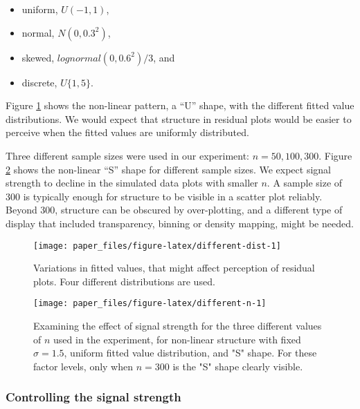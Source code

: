 \documentclass[]{interact}
\theoremstyle{plain}%
\theoremstyle{definition}
\theoremstyle{remark}
\providecommand{\tightlist}{%
  \setlength{\itemsep}{0pt}\setlength{\parskip}{0pt}}
\def\tightlist{}
\begin{document}
\begin{itemize}
\tightlist
\item
  uniform, \(U(-1, 1)\),
\item
  normal, \(N(0, 0.3^2)\),
\item
  skewed, \(lognormal(0, 0.6^2)/3\), and
\item
  discrete, \(U\{1, 5\}\).
\end{itemize}

\noindent Figure \ref{fig:different-dist} shows the non-linear pattern,
a ``U'' shape, with the different fitted value distributions. We would
expect that structure in residual plots would be easier to perceive when
the fitted values are uniformly distributed.

Three different sample sizes were used in our experiment:
\(n = 50, 100, 300\). Figure \ref{fig:different-n} shows the non-linear
``S'' shape for different sample sizes. We expect signal strength to
decline in the simulated data plots with smaller \(n\). A sample size of
300 is typically enough for structure to be visible in a scatter plot
reliably. Beyond 300, structure can be obscured by over-plotting, and a
different type of display that included transparency, binning or density
mapping, might be needed.

\begin{figure}

{\centering \texttt{[image: paper\_files/figure-latex/different-dist-1]} 

}

\caption{Variations in fitted values, that might affect perception of residual plots. Four different distributions are used.}\label{fig:different-dist}
\end{figure}

\begin{figure}

{\centering \texttt{[image: paper\_files/figure-latex/different-n-1]} 

}

\caption{Examining the effect of signal strength for the three different values of $n$ used in the experiment, for non-linear structure with fixed $\sigma = 1.5$, uniform fitted value distribution, and "S" shape. For these factor levels, only when $n = 300$ is the "S" shape clearly visible.}\label{fig:different-n}
\end{figure}

\hypertarget{controlling-the-signal-strength}{%
\subsubsection{Controlling the signal
strength}\label{controlling-the-signal-strength}}
\end{document}
